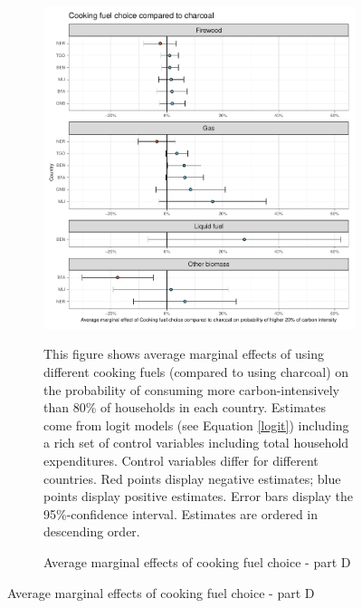  \begin{figure}[ht!]\ContinuedFloat
   \centering
   \begin{subfigure}[b]{\textwidth}
   \centering
   \includegraphics{1_Figures/Analysis_Logit_Models_Marginal_Effects/Average_Marginal_Effects_affected_upper_80_CF_Charcoal_2017B.pdf}
   \caption{Average marginal effects of cooking fuel choice - part D} \label{fig:Logit_ME_CF_4}
   \begin{subcaption2}
     This figure shows average marginal effects of using different cooking fuels (compared to using charcoal) on the probability of consuming more carbon-intensively than 80\% of households in each country. Estimates come from logit models (see Equation \ref{logit}) including a rich set of control variables including total household expenditures. Control variables differ for different countries. Red points display negative estimates; blue points display positive estimates. Error bars display the 95\%-confidence interval. Estimates are ordered in descending order.
   \end{subcaption2}
   \end{subfigure}
 \end{figure}
 \clearpage
